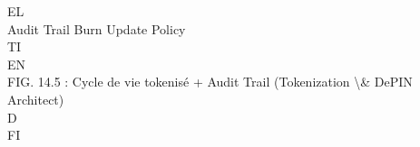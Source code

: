 \vspace{0.5em}
\vspace{0.5em}
\vspace{0.5em}
EL\\
Audit Trail          Burn           Update Policy\\
\vspace{0.5em}
\vspace{0.5em}
\vspace{0.5em}
\vspace{0.5em}
TI\\
EN\\
FIG. 14.5 : Cycle de vie tokenisé + Audit Trail (Tokenization \textbackslash{}& DePIN Architect)\\
\vspace{0.5em}
\vspace{0.5em}
\vspace{0.5em}
\vspace{0.5em}
D\\
FI\\
